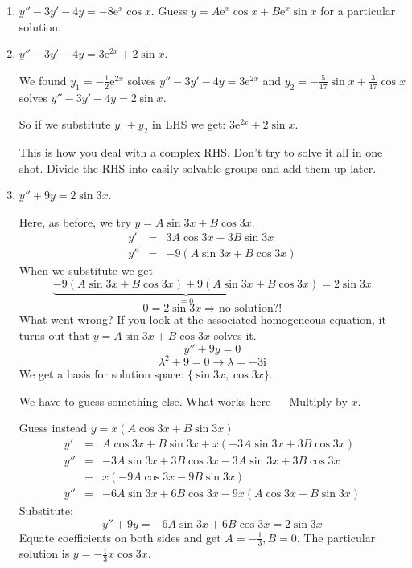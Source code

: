 \documentclass{article}
\newcommand{\mathe}{\mathrm{e}}
\newcommand{\mathi}{\mathrm{i}}
\begin{document}
\begin{enumerate}
  \item $y'' - 3 y' - 4 y = - 8 \mathe^x \cos x$. Guess $y = A \mathe^x \cos x
  + B \mathe^x \sin x$ for a particular solution.
  
  \item $y'' - 3 y' - 4 y = 3 \mathe^{2 x} + 2 \sin x$.
  
  We found $y_1 = - \frac{1}{2} \mathe^{2 x}$ solves $y'' - 3 y' - 4 y = 3
  \mathe^{2 x}$ and $y_2 = - \frac{5}{17} \sin x + \frac{3}{17} \cos x$ solves
  $y'' - 3 y' - 4 y = 2 \sin x$.
  
  So if we substitute $y_1 + y_2$ in LHS we get: $3 \mathe^{2 x} + 2 \sin x$.
  
  This is how you deal with a complex RHS. Don't try to solve it all in one
  shot. Divide the RHS into easily solvable groups and add them up later.
  
  \item $y'' + 9 y = 2 \sin 3 x$.
  
  Here, as before, we try $y = A \sin 3 x + B \cos 3 x$.
  \begin{eqnarray*}
    y' & = & 3 A \cos 3 x - 3 B \sin 3 x\\
    y'' & = & - 9 (A \sin 3 x + B \cos 3 x)
  \end{eqnarray*}
  When we substitute we get
  \[ \underbrace{- 9 (A \sin 3 x + B \cos 3 x) + 9 (A \sin 3 x + B \cos 3
     x)}_{= 0} = 2 \sin 3 x \]
  \[ 0 = 2 \sin 3 x \Rightarrow \text{no solution?!} \]
  What went wrong? If you look at the associated homogeneous equation, it
  turns out that $y = A \sin 3 x + B \cos 3 x$ solves it.
  \[ y'' + 9 y = 0 \]
  \[ \lambda^2 + 9 = 0 \rightarrow \lambda = \pm 3 \mathi \]
  We get a basis for solution space: $\{ \sin 3 x, \cos 3 x \}$.
  
  We have to guess something else. What works here --- Multiply by $x$.
  
  Guess instead $y = x (A \cos 3 x + B \sin 3 x)$
  \begin{eqnarray*}
    y' & = & A \cos 3 x + B \sin 3 x + x (- 3 A \sin 3 x + 3 B \cos 3 x)\\
    y'' & = & - 3 A \sin 3 x + 3 B \cos 3 x - 3 A \sin 3 x + 3 B \cos 3 x\\
    & + & x (- 9 A \cos 3 x - 9 B \sin 3 x)\\
    y'' & = & - 6 A \sin 3 x + 6 B \cos 3 x - 9 x (A \cos 3 x + B \sin 3 x)
  \end{eqnarray*}
  Substitute:
  \[ y'' + 9 y = - 6 A \sin 3 x + 6 B \cos 3 x = 2 \sin 3 x \]
  Equate coefficients on both sides and get $A = - \frac{1}{3}, B = 0$. The
  particular solution is $y = - \frac{1}{3} x \cos 3 x$.
  

\end{enumerate}
\end{document}
